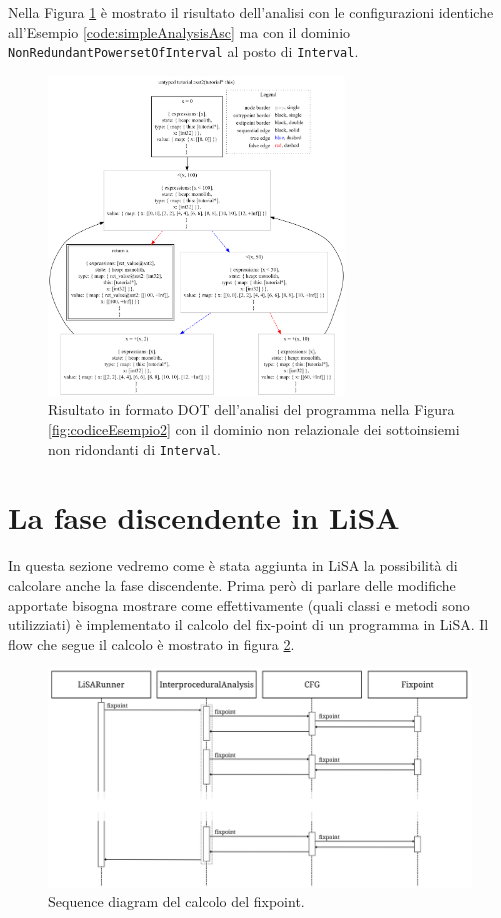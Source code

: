 Nella Figura \ref{fig:risultatoAscPowerset} è mostrato il risultato dell'analisi con le configurazioni identiche all'Esempio \ref{code:simpleAnalysisAsc} ma con il dominio \texttt{NonRedundantPowersetOfInterval} al posto di \texttt{Interval}.
\begin{figure}[ht]
	\centering
	\includegraphics[width=0.7\textwidth]{Immagini/graphvizAscPowerset.png}
	\caption{Risultato in formato DOT dell'analisi del programma nella Figura \ref{fig:codiceEsempio2} con il dominio non relazionale dei sottoinsiemi non ridondanti di \texttt{Interval}.}
	\label{fig:risultatoAscPowerset}
\end{figure}

\section{La fase discendente in LiSA}\label{sec:descendingLiSA}
In questa sezione vedremo come è stata aggiunta in LiSA la possibilità di calcolare anche la fase discendente. Prima però di parlare delle modifiche apportate bisogna mostrare come effettivamente (quali classi e metodi sono utilizziati) è implementato il calcolo del fix-point di un programma in LiSA. Il flow che segue il calcolo è mostrato in figura \ref{fig:flowFixpoint}. 
\begin{figure}[ht]
	\centering
	\includegraphics[width=\textwidth]{Immagini/flowFixpoint.png}
	\caption{Sequence diagram del calcolo del fixpoint.}
	\label{fig:flowFixpoint}
\end{figure}

